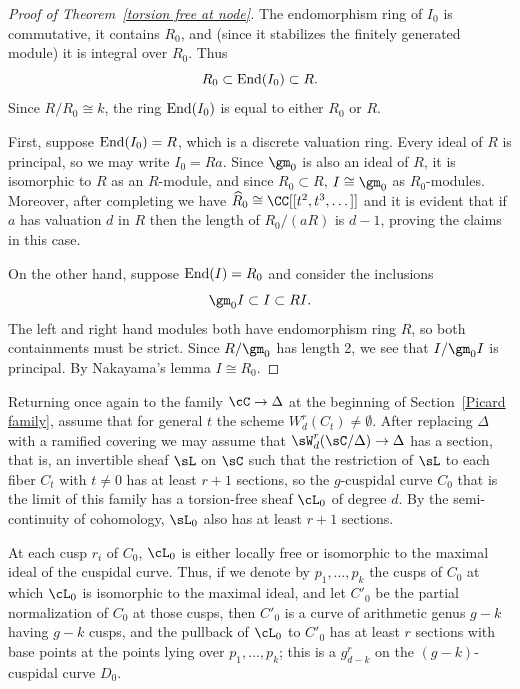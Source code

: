 \begin{proof}[Proof of Theorem~\ref{torsion free at node}] 

\def\End{{\rm End}}

The endomorphism ring of $I_0$ is commutative, it contains $R_0$,  and (since it stabilizes the finitely
generated module) it is integral over $R_0$. Thus
$$
R_0 \subset \End(I_0) \subset R.
$$
Since
$R/R_0 \cong k$, the ring $\End(I_0)$ is equal to either 
$R_0$ or $R$. 

First, suppose
$\End(I_{0})=R$, which is a discrete valuation ring. Every ideal of $R$ is principal, so we may write $I_{0} = Ra$.
 Since $\gm_0$ is also an ideal of $R$, it is isomorphic to $R$
as an $R$-module, and since $R_0\subset R$,
$I \cong \gm_0$ as $R_0$-modules. Moreover, after completing we have $\widehat R_{0} \cong \CC[[t^{2}, t^{3}, \dots]]$ and it is evident that if $a$ has valuation $d$ in $R$ then the length of $R_{0}/(aR)$ is $d-1$, proving the claims in this case.

On the other hand, suppose
$\End(I)=R_0$
 and consider the inclusions
$$
\gm_0 I \subset I \subset R I.
$$
The left and right hand modules both have endomorphism ring $R$,
so both containments must be strict. Since $R/\gm_0$ has length 2,
we see that $I/\gm_0 I$ is principal. By Nakayama's lemma $I\cong R_0$.
\end{proof}

Returning once again to the family $\cC \to \Delta$ at the beginning of Section~\ref{Picard family}, assume that for general $t$ the scheme $W^{r}_{d}(C_t)\neq \emptyset$. After replacing $\Delta$ with a ramified covering
we may assume that $\sW^{r}_{d}(\sC/\Delta) \to \Delta$ has a section, that is, an invertible sheaf $\sL$ on $\sC$
 such that the restriction of $\sL$ to each fiber $C_{t}$ with $t\neq 0$ has at least $r+1$ sections, so the $g$-cuspidal curve $C_0$ that is the limit of this family has a torsion-free sheaf $\cL_0$ of degree $d$. By the semi-continuity
 of cohomology, $\sL_{0}$ also has at least $r+1$ sections. 

At each cusp $r_i$ of $C_0$, $\cL_0$ is either locally free or isomorphic to the maximal ideal of the cuspidal curve. Thus, if we denote by $p_1,\dots, p_k$ the cusps of $C_0$ at which $\cL_0$ is isomorphic to the maximal ideal, and let $C'_{0}$ be the partial normalization of $C_0$ at those cusps, then $C'_{0}$ is a curve of arithmetic genus $g-k$ having $g-k$ cusps, and the pullback of $\cL_0$ to $C'_{0}$ has at least $r$ sections with base points at the points lying over $p_1,\dots,p_k$;  this is a $g^r_{d-k}$ on the $(g-k)$-cuspidal curve  $D_0$.




